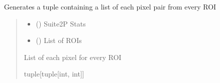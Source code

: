 \documentclass[letterpaper,10pt,english]{sphinxmanual}
\begin{document}
\begin{fulllineitems}
\label{\detokenize{Colorizer:Colorizer.generate_pixel_pairs}}
\pysigstartsignatures
{}
\pysigstopsignatures
\sphinxAtStartPar
Generates a tuple containing a list of each pixel pair from every ROI
\begin{quote}\begin{description}
\begin{itemize}
\item {} 
\sphinxAtStartPar
{} () \textendash{} Suite2P Stats

\item {} 
\sphinxAtStartPar
{} (\sphinxstyleliteralemphasis{\sphinxupquote{{[}}}\sphinxstyleliteralemphasis{\sphinxupquote{{]}}}) \textendash{} List of ROIs

\end{itemize}

\sphinxAtStartPar
List of each pixel for every ROI

\sphinxAtStartPar
tuple{[}tuple{[}int, int{]}{]}

\end{description}\end{quote}

\end{fulllineitems}

\end{document}
